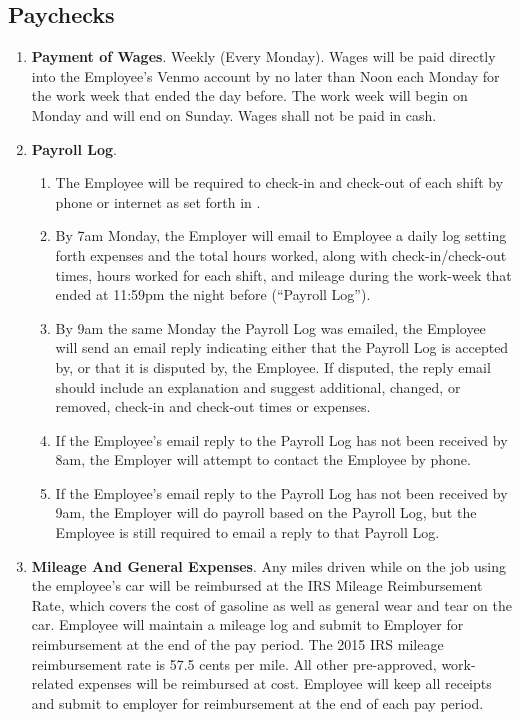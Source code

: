 \documentclass[]{article}
\begin{document}
\subsection*{Paychecks}
\begin{enumerate}
	\item{\textbf{Payment of Wages}}. Weekly (Every Monday). Wages will be paid directly into the Employee's Venmo account by no later than Noon each Monday for the work week that ended the day before. The work week will begin on Monday and will end on Sunday. Wages shall not be paid in cash.
	\item{\textbf{Payroll Log}}. 
		\begin{enumerate}
			\item The Employee will be required to check-in and check-out of each shift by phone or internet as set forth in . 
			\item By 7am Monday, the Employer will email to Employee a daily log setting forth expenses and the total hours worked, along with check-in/check-out times, hours worked for each shift, and mileage during the work-week that ended at 11:59pm the night before (``Payroll Log'').
			\item By 9am the same Monday the Payroll Log was emailed, the Employee will send an email reply indicating either that the Payroll Log is accepted by, or that it is disputed by, the Employee. If disputed, the reply email should include an explanation and suggest additional, changed, or removed, check-in and check-out times or expenses.
			\item If the Employee's email reply to the Payroll Log has not been received by 8am, the Employer will attempt to contact the Employee by phone.
			\item If the Employee's email reply to the Payroll Log has not been received by 9am, the Employer will do payroll based on the Payroll Log, but the Employee is still required to email a reply to that Payroll Log.
		\end{enumerate}
	\item{\textbf{Mileage And General Expenses}}. Any miles driven while on the job using the employee's car will be reimbursed at the IRS Mileage Reimbursement Rate, which covers the cost of gasoline as well as general wear and tear on the car. Employee will maintain a mileage log and submit to Employer for reimbursement at the end of the pay period. The 2015 IRS mileage reimbursement rate is 57.5 cents per mile.  All other pre-approved, work-related expenses will be reimbursed at cost. Employee will keep all receipts and submit to employer for reimbursement at the end of each pay period.

\end{enumerate}
\end{document}
